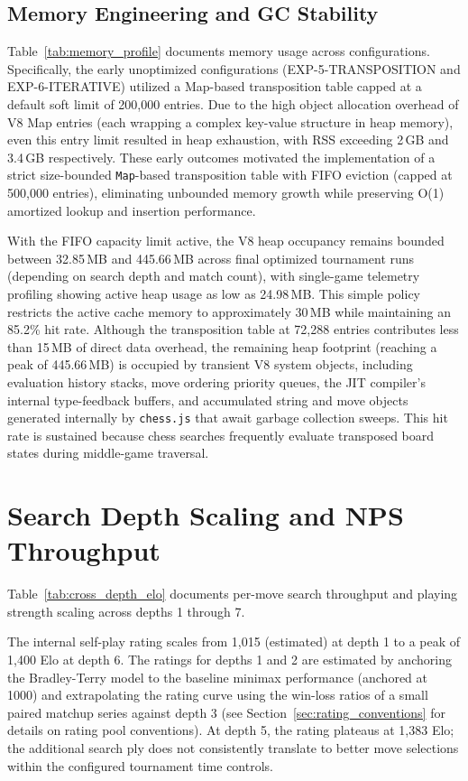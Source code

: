 \subsection{Memory Engineering and GC Stability}
Table~\ref{tab:memory_profile} documents memory usage across configurations. Specifically, the early unoptimized configurations (EXP-5-TRANSPOSITION and EXP-6-ITERATIVE) utilized a Map-based transposition table capped at a default soft limit of 200,000 entries. Due to the high object allocation overhead of V8 Map entries (each wrapping a complex key-value structure in heap memory), even this entry limit resulted in heap exhaustion, with RSS exceeding 2\,GB and 3.4\,GB respectively. These early outcomes motivated the implementation of a strict size-bounded \texttt{Map}-based transposition table with FIFO eviction (capped at 500,000 entries), eliminating unbounded memory growth while preserving O(1) amortized lookup and insertion performance.



With the FIFO capacity limit active, the V8 heap occupancy remains bounded between 32.85\,MB and 445.66\,MB across final optimized tournament runs (depending on search depth and match count), with single-game telemetry profiling showing active heap usage as low as 24.98\,MB. This simple policy restricts the active cache memory to approximately 30\,MB while maintaining an 85.2\% hit rate. Although the transposition table at 72,288 entries contributes less than 15\,MB of direct data overhead, the remaining heap footprint (reaching a peak of 445.66\,MB) is occupied by transient V8 system objects, including evaluation history stacks, move ordering priority queues, the JIT compiler's internal type-feedback buffers, and accumulated string and move objects generated internally by \texttt{chess.js} that await garbage collection sweeps. This hit rate is sustained because chess searches frequently evaluate transposed board states during middle-game traversal.

\section{Search Depth Scaling and NPS Throughput}
Table~\ref{tab:cross_depth_elo} documents per-move search throughput and playing strength scaling across depths 1 through 7.



The internal self-play rating scales from 1,015 (estimated) at depth 1 to a peak of 1,400 Elo at depth 6. The ratings for depths 1 and 2 are estimated by anchoring the Bradley-Terry model to the baseline minimax performance (anchored at 1000) and extrapolating the rating curve using the win-loss ratios of a small paired matchup series against depth 3 (see Section~\ref{sec:rating_conventions} for details on rating pool conventions). At depth 5, the rating plateaus at 1,383 Elo; the additional search ply does not consistently translate to better move selections within the configured tournament time controls.

